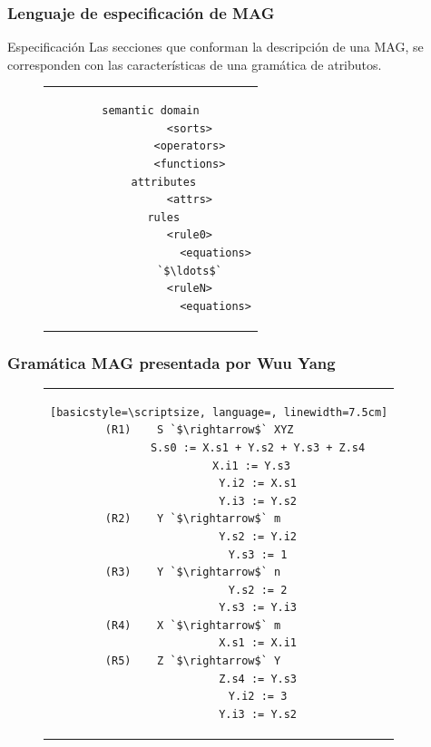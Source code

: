\documentclass[10pt, xcolor=table, xcolor=dvipsnames]{beamer}
\begin{document}
\begin{frame}[fragile]
    \frametitle{Lenguaje de especificación de MAG}

    \begin{block}{Especificación}
    Las secciones que conforman la descripción de una MAG, se corresponden con las características de una gramática de atributos.
    \end{block}
    
\begin{figure}[h]
\begin{center}
\begin{tabular}{c}
 \begin{lstlisting}[language=specmag, basicstyle=\small, linewidth=7cm]
    semantic domain
            <sorts>
            <operators>
            <functions>
    attributes
            <attrs>
    rules
            <rule0>
                    <equations>
            `$\ldots$`
            <ruleN>
                    <equations>
\end{lstlisting} 
\end{tabular}
\end{center}
\end{figure}
\end{frame}

\begin{frame}[fragile]
    \frametitle{Gramática MAG presentada por Wuu Yang}

\begin{figure}[h]
\begin{center}
\begin{tabular}{c}
\begin{lstlisting}[basicstyle=\scriptsize, language=, linewidth=7.5cm]
(R1)    S `$\rightarrow$` XYZ      
            S.s0 := X.s1 + Y.s2 + Y.s3 + Z.s4
            X.i1 := Y.s3  
            Y.i2 := X.s1
            Y.i3 := Y.s2
(R2)    Y `$\rightarrow$` m        
            Y.s2 := Y.i2
            Y.s3 := 1
(R3)    Y `$\rightarrow$` n        
            Y.s2 := 2
            Y.s3 := Y.i3
(R4)    X `$\rightarrow$` m        
            X.s1 := X.i1
(R5)    Z `$\rightarrow$` Y        
            Z.s4 := Y.s3
            Y.i2 := 3
            Y.i3 := Y.s2
\end{lstlisting} 
\end{tabular}
\end{center}
\end{figure}
\end{frame}
\end{document}
